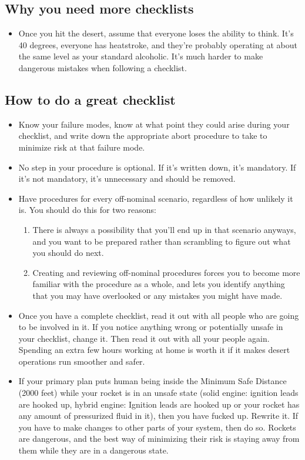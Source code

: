 \subsection{Why you need more checklists}
    \begin{itemize}
        \item Once you hit the desert, assume that everyone loses the ability to think. It's 40 degrees, everyone has heatstroke, and they're probably operating at about the same level as your standard alcoholic. It's much harder to make dangerous mistakes when following a checklist.
    \end{itemize}

\subsection{How to do a great checklist}
    \begin{itemize}
        \item Know your failure modes, know at what point they could arise during your checklist, and write down the appropriate abort procedure to take to minimize risk at that failure mode.
        \item No step in your procedure is optional. If it’s written down, it’s mandatory. If it’s not mandatory, it’s unnecessary and should be removed.
        \item Have procedures for every off-nominal scenario, regardless of how unlikely it is. You should do this for two reasons: 
        \begin{enumerate}
            \item There is always a possibility that you’ll end up in that scenario anyways, and you want to be prepared rather than scrambling to figure out what you should do next.
            \item Creating and reviewing off-nominal procedures forces you to become more familiar with the procedure as a whole, and lets you identify anything that you may have overlooked or any mistakes you might have made.
        \end{enumerate}
        \item Once you have a complete checklist, read it out with all people who are going to be involved in it. If you notice anything wrong or potentially unsafe in your checklist, change it. Then read it out with all your people again. Spending an extra few hours working at home is worth it if it makes desert operations run smoother and safer.
        \item If your primary plan puts human being inside the Minimum Safe Distance (2000 feet) while your rocket is in an unsafe state (solid engine: ignition leads are hooked up, hybrid engine: Ignition leads are hooked up or your rocket has any amount of pressurized fluid in it), then you have fucked up. Rewrite it. If you have to make changes to other parts of your system, then do so. Rockets are dangerous, and the best way of minimizing their risk is staying away from them while they are in a dangerous state.
    \end{itemize}

